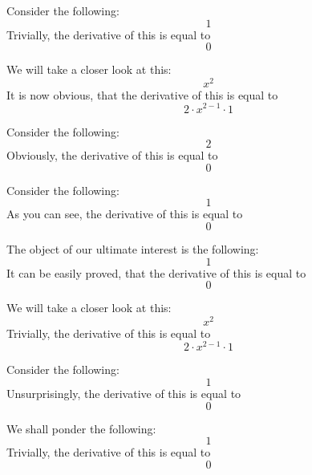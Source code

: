 \documentclass{article}
\begin{document}
Consider the following:
\begin{equation}
1 
\end{equation}
Trivially, the derivative of this is equal to
\begin{equation}
0 
\end{equation}

We will take a closer look at this:
\begin{equation}
x ^{2 } 
\end{equation}
It is now obvious, that the derivative of this is equal to
\begin{equation}
2 \cdot x ^{2 - 1 } \cdot 1 
\end{equation}

Consider the following:
\begin{equation}
2 
\end{equation}
Obviously, the derivative of this is equal to
\begin{equation}
0 
\end{equation}

Consider the following:
\begin{equation}
1 
\end{equation}
As you can see, the derivative of this is equal to
\begin{equation}
0 
\end{equation}

The object of our ultimate interest is the following:
\begin{equation}
1 
\end{equation}
It can be easily proved, that the derivative of this is equal to
\begin{equation}
0 
\end{equation}

We will take a closer look at this:
\begin{equation}
x ^{2 } 
\end{equation}
Trivially, the derivative of this is equal to
\begin{equation}
2 \cdot x ^{2 - 1 } \cdot 1 
\end{equation}

Consider the following:
\begin{equation}
1 
\end{equation}
Unsurprisingly, the derivative of this is equal to
\begin{equation}
0 
\end{equation}

We shall ponder the following:
\begin{equation}
1 
\end{equation}
Trivially, the derivative of this is equal to
\begin{equation}
0 
\end{equation}
\end{document}
